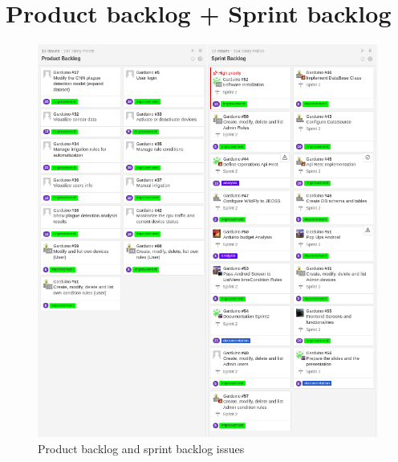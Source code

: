 \documentclass[11pt,a4paper]{article}
\begin{document}
\section{Product backlog + Sprint backlog}
\begin{figure}[hbtp]
\centering
\includegraphics[scale=0.6]{figures/Sprint2.png}
\caption{Product backlog and sprint backlog issues}
\end{figure}
\newpage
\end{document}
